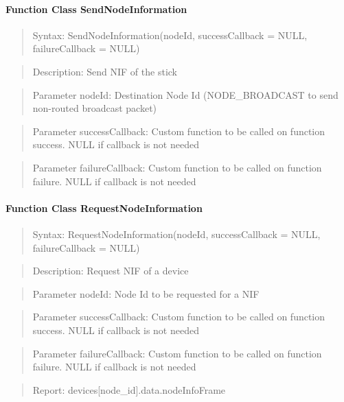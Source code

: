 \paragraph{Function Class SendNodeInformation}
\begin{quote}Syntax: SendNodeInformation(nodeId, successCallback = NULL, failureCallback = NULL)\end{quote}
\begin{quote}Description: Send NIF of the stick\end{quote}
\begin{quote}Parameter nodeId: Destination Node Id (NODE\_BROADCAST to send non-routed broadcast packet)\end{quote}
\begin{quote}Parameter successCallback: Custom function to be called on function success. NULL if callback is not needed\end{quote}
\begin{quote}Parameter failureCallback: Custom function to be called on function failure. NULL if callback is not needed\end{quote}


\paragraph{Function Class RequestNodeInformation}
\begin{quote}Syntax: RequestNodeInformation(nodeId, successCallback = NULL, failureCallback = NULL)\end{quote}
\begin{quote}Description: Request NIF of a device\end{quote}
\begin{quote}Parameter nodeId: Node Id to be requested for a NIF\end{quote}
\begin{quote}Parameter successCallback: Custom function to be called on function success. NULL if callback is not needed\end{quote}
\begin{quote}Parameter failureCallback: Custom function to be called on function failure. NULL if callback is not needed\end{quote}
\begin{quote}Report: devices[node\_id].data.nodeInfoFrame\end{quote}

